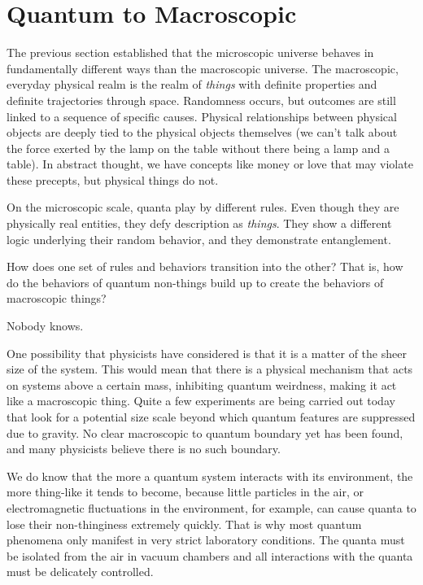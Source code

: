 \documentclass[onecolumn,preprintnumbers,amsmath,amssymbn,reprint,nofootinbib,superscriptaddress]{revtex4}    %
\begin{document}

%
\section{Quantum to Macroscopic}

The previous section established that the microscopic universe behaves in fundamentally different ways than the macroscopic universe.  The macroscopic, everyday physical realm is the realm of {\em things} with definite properties and definite trajectories through space. Randomness occurs, but outcomes are still linked to a sequence of specific causes.  Physical relationships between physical objects are deeply tied to the physical objects themselves (we can't talk about the force exerted by the lamp on the table without there being a lamp and a table).  In abstract thought, we have concepts like money or love that may violate these precepts, but physical things do not. 

On the microscopic scale, quanta play by different rules.  Even though they are physically real entities, they defy description as {\em things}.  They show a different logic underlying their random behavior, and they demonstrate entanglement.  

How does one set of rules and behaviors transition into the other?  That is, how do the behaviors of quantum non-things build up to create the behaviors of macroscopic things?

Nobody knows.  

One possibility that physicists have considered is that it is a matter of the sheer size of the system. This would mean that there is a physical mechanism that acts on systems above a certain mass, inhibiting quantum weirdness, making it act like a macroscopic thing. Quite a few experiments are being carried out today that look for a potential size scale beyond which quantum features are suppressed due to gravity. No clear macroscopic to quantum boundary yet has been found, and many physicists believe there is no such boundary.

We do know that the more a quantum system interacts with its environment, the more thing-like it tends to become, because little particles in the air, or electromagnetic fluctuations in the environment, for example, can cause quanta to lose their non-thinginess extremely quickly. That is why most quantum phenomena only manifest in very strict laboratory conditions. The quanta must be isolated from the air in vacuum chambers and all interactions with the quanta must be delicately controlled. 
\end{document}
